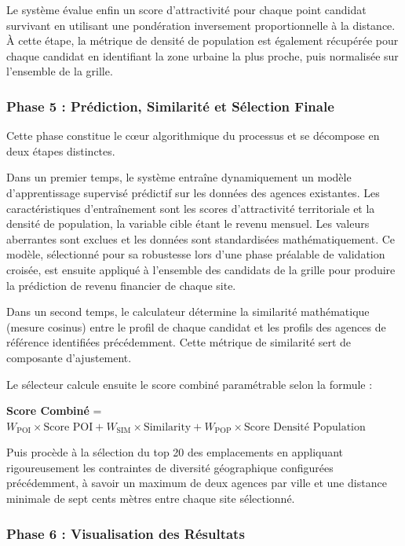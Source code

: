 \documentclass[11pt,a4paper,twoside]{report}
\begin{document}
Le système évalue enfin un score d'attractivité pour chaque point candidat survivant en utilisant une pondération inversement proportionnelle à la distance. À cette étape, la métrique de densité de population est également récupérée pour chaque candidat en identifiant la zone urbaine la plus proche, puis normalisée sur l'ensemble de la grille.

\subsubsection*{Phase 5 : Prédiction, Similarité et Sélection Finale}

Cette phase constitue le cœur algorithmique du processus et se décompose en deux étapes distinctes.

Dans un premier temps, le système entraîne dynamiquement un modèle d'apprentissage supervisé prédictif sur les données des agences existantes. Les caractéristiques d'entraînement sont les scores d'attractivité territoriale et la densité de population, la variable cible étant le revenu mensuel. Les valeurs aberrantes sont exclues et les données sont standardisées mathématiquement. Ce modèle, sélectionné pour sa robustesse lors d'une phase préalable de validation croisée, est ensuite appliqué à l'ensemble des candidats de la grille pour produire la prédiction de revenu financier de chaque site.

Dans un second temps, le calculateur détermine la similarité mathématique (mesure cosinus) entre le profil de chaque candidat et les profils des agences de référence identifiées précédemment. Cette métrique de similarité sert de composante d'ajustement.

Le sélecteur calcule ensuite le score combiné paramétrable selon la formule :

\begin{center}
\textbf{Score Combiné} = $W_{\text{POI}} \times \text{Score POI} + W_{\text{SIM}} \times \text{Similarity} + W_{\text{POP}} \times \text{Score Densité Population}$
\end{center}

Puis procède à la sélection du top 20 des emplacements en appliquant rigoureusement les contraintes de diversité géographique configurées précédemment, à savoir un maximum de deux agences par ville et une distance minimale de sept cents mètres entre chaque site sélectionné.

\subsubsection*{Phase 6 : Visualisation des Résultats}
\end{document}
